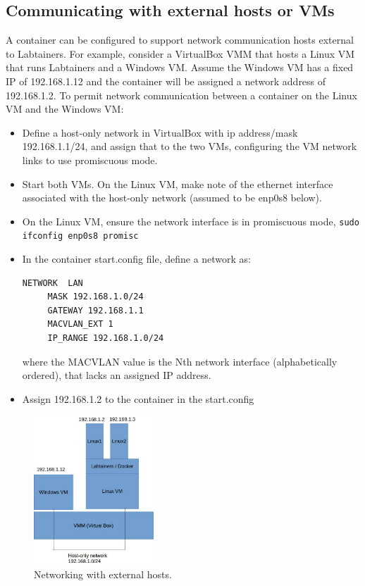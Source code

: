 \documentclass[12pt]{article}
\begin{document}
\subsection{Communicating with external hosts or VMs}
\label {external hosts}
A container can be configured to support network communication hosts external to Labtainers.
For example, consider a VirtualBox VMM that hosts a Linux VM that runs Labtainers and
a Windows VM.  Assume the Windows VM has a fixed IP of 192.168.1.12 and the container 
will be assigned a network address of 192.168.1.2.  To permit network communication between 
a container on the Linux VM and the Windows VM:
\begin{itemize}
\item Define a host-only network in VirtualBox with ip address/mask 192.168.1.1/24, and assign that to the two VMs, configuring the VM
network links to use promiscuous mode.
\item Start both VMs.  On the Linux VM, make note of the ethernet interface associated with the host-only network (assumed to be enp0s8 below).
\item On the Linux VM, ensure the network interface is in promiscuous mode, {\tt sudo ifconfig enp0s8 promisc}
\item In the container start.config file, define a network as:
\begin{verbatim}
NETWORK  LAN
     MASK 192.168.1.0/24
     GATEWAY 192.168.1.1
     MACVLAN_EXT 1
     IP_RANGE 192.168.1.0/24
\end{verbatim}
\noindent where the MACVLAN value is the Nth network interface (alphabetically ordered), that lacks an assigned IP address.
\item Assign 192.168.1.2 to the container in the start.config
\end{itemize}

\begin{figure}[ht]
\centering
\includegraphics[width=0.4\textwidth,natwidth=621,natheight=403]{ExternalNetworks.jpg}
\caption{Networking with external hosts.}
\label{fig:external hosts}
\end{figure}
\end{document}
